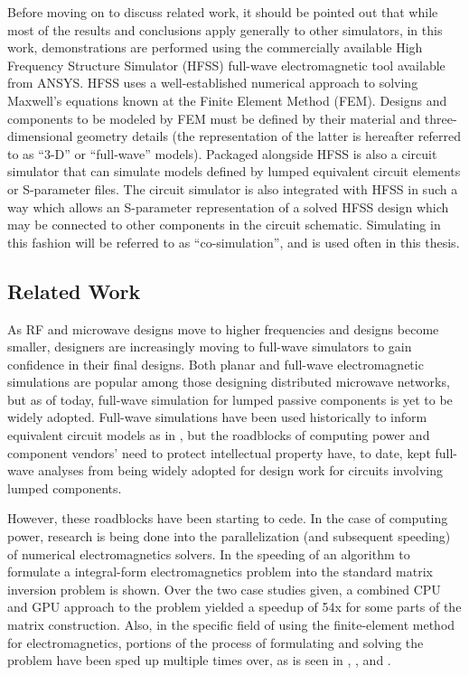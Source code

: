\documentclass[12pt]{usfcoe}
\begin{document}
    Before moving on to discuss related work, it should be pointed out that while most of the results and conclusions apply generally to other simulators, in this work, demonstrations are performed using the commercially available High Frequency Structure Simulator (HFSS)  full-wave electromagnetic tool available from ANSYS. 
    HFSS uses a well-established numerical approach to solving Maxwell's equations known at the Finite Element Method (FEM).  
    Designs and components to be modeled by FEM must be defined by their material and three-dimensional geometry details (the representation of the latter is hereafter referred to as ``3-D'' or ``full-wave'' models). 
    Packaged alongside HFSS is also a circuit simulator that can simulate models defined by lumped equivalent circuit elements or S-parameter files.  
    The circuit simulator is also integrated with HFSS in such a way which allows an S-parameter representation of a solved HFSS design which may be connected to other components in the circuit schematic. 
    Simulating in this fashion will be referred to as ``co-simulation'', and is used often in this thesis.

\subsection{Related Work}
		
    \indent As RF and microwave designs move to higher frequencies and designs become smaller, designers are increasingly moving to full-wave simulators to gain confidence in their final designs. 
    Both planar and full-wave electromagnetic simulations are popular among those designing distributed microwave networks, but as of today, full-wave simulation for lumped passive components is yet to be widely adopted.
    Full-wave simulations have been used historically to inform equivalent circuit models as in \cite{LumpedElementHemtParasitics}, but the roadblocks of computing power and component vendors' need to protect intellectual property have, to date, kept full-wave analyses from being widely adopted for design work  for circuits involving lumped components. 
  

    However, these roadblocks have been starting to cede.
    In the case of computing power, research is being done into the parallelization (and subsequent speeding) of numerical electromagnetics solvers.
    In \cite{GPUOptimization} the speeding of an algorithm to formulate a integral-form electromagnetics problem into the standard matrix inversion problem is shown. 
    Over the two case studies given, a combined CPU and GPU approach to the problem yielded a speedup of 54x for some parts of the matrix construction. Also, in the specific field of using the finite-element method for electromagnetics, portions of the process of formulating and solving the problem have been sped up multiple times over, as is seen in \cite{GPU1}, \cite{GPU2}, and \cite{GPU3}.
\end{document}
